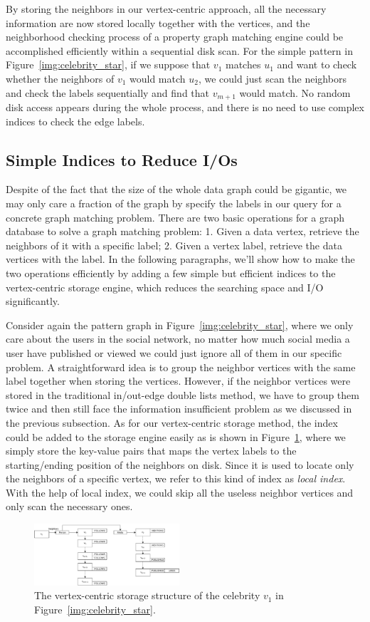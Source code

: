 By storing the neighbors in our vertex-centric approach,
all the necessary information are now stored locally together with the vertices,
and the neighborhood checking process of a property graph matching engine could be accomplished efficiently within a sequential disk scan.
For the simple pattern in Figure~\ref{img:celebrity_star}, if we suppose that $v_1$ matches $u_1$ and want to check whether the neighbors of $v_1$ would match $u_2$, we could just scan the neighbors and check the labels sequentially and find that $v_{m+1}$ would match.
No random disk access appears during the whole process, and there is no need to use complex indices to check the edge labels.
\subsection{Simple Indices to Reduce I/Os}
Despite of the fact that the size of the whole data graph could be gigantic,
we may only care a fraction of the graph by specify the labels in our query for a concrete graph matching problem.
There are two basic operations for a graph database to solve a graph matching problem:
1. Given a data vertex, retrieve the neighbors of it with a specific label;
2. Given a vertex label, retrieve the data vertices with the label.
In the following paragraphs, we'll show how to make the two operations efficiently by adding a few simple but efficient indices to the vertex-centric storage engine,
which reduces the searching space and I/O significantly.

Consider again the pattern graph in Figure~\ref{img:celebrity_star}, where we only care about the users in the social network,
no matter how much social media a user have published or viewed we could just ignore all of them in our specific problem.
A straightforward idea is to group the neighbor vertices with the same label together when storing the vertices.
However, if the neighbor vertices were stored in the traditional in/out-edge double lists method,
we have to group them twice and then still face the information insufficient problem as we discussed in the previous subsection.
As for our vertex-centric storage method,
the index could be added to the storage engine easily as is shown in Figure~\ref{img:data_neighbors},
where we simply store the key-value pairs that maps the vertex labels to the starting/ending position of the neighbors on disk.
Since it is used to locate only the neighbors of a specific vertex, we refer to this kind of index as \emph{local index}.
With the help of local index, we could skip all the useless neighbor vertices and only scan the necessary ones.
\begin{figure}[ht]
  \centering
  \includegraphics[width=0.48\textwidth]{img/data_neighbors.pdf}
  \caption{The vertex-centric storage structure of the celebrity $v_1$ in Figure~\ref{img:celebrity_star}.}\label{img:data_neighbors}
\end{figure}

